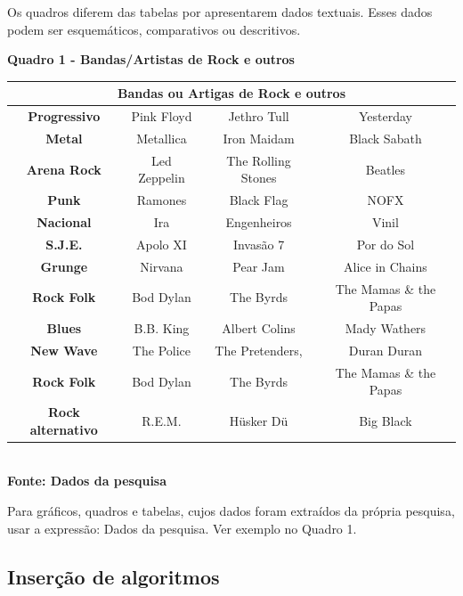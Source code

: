 Os quadros diferem das tabelas por apresentarem dados textuais.
Esses dados podem ser esquemáticos, comparativos ou descritivos.

   \begin{center}
          \centering
       	\textbf{Quadro 1 - Bandas/Artistas de Rock e outros}\\
        \label{quadro1}
	\begin{tabular}{|c|c|c|c|} \hline
	\multicolumn{4}{|c|}{\textbf{Bandas ou Artigas de Rock e outros}} 	  \\ 
		\hline \textbf{	Progressivo} & Pink Floyd & Jethro Tull	& Yesterday \\ 
		 \hline \textbf{ Metal}  & Metallica & Iron Maidam & Black Sabath \\ 
		\hline \textbf{	Arena Rock} & Led Zeppelin & The Rolling Stones & Beatles \\ 
		\hline \textbf{ Punk} & Ramones & Black Flag & NOFX	\\ 
		\hline \textbf{	Nacional} & Ira & Engenheiros & Vinil	\\ 
		\hline \textbf{	S.J.E.} & Apolo XI & Invasão 7 & Por do Sol \\ 
		\hline \textbf{	Grunge} & Nirvana & Pear Jam & Alice in Chains	\\ 
		\hline \textbf{	Rock Folk} & Bod Dylan & The Byrds &  The Mamas \& the Papas \\
		\hline \textbf{	Blues} & B.B. King & Albert Colins & Mady Wathers \\ 
		\hline \textbf{	New Wave} & The Police & The Pretenders, &  Duran Duran\\ 
 		\hline \textbf{	Rock Folk} & Bod Dylan & The Byrds &  The Mamas \& the Papas \\
 		\hline \textbf{	Rock alternativo} & R.E.M.& Hüsker Dü & Big Black\\ 
 		
		\hline
	\end{tabular}
	\vspace{0.1cm} 
	{\footnotesize\\ \textbf{Fonte: Dados da pesquisa}}
   \end{center}

Para gráficos, quadros e tabelas, cujos dados foram extraídos da própria pesquisa, 
 usar a expressão: Dados da pesquisa. Ver exemplo no Quadro 1.
   

\subsection{\esp Inserção de algoritmos}

